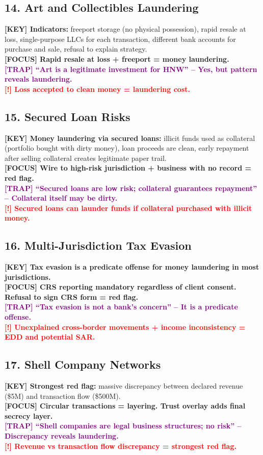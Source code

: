\documentclass[10pt,a4paper]{article}
\newcommand{\redflag}[1]{\textcolor{red}{\textbf{[!] #1}}}
\newcommand{\examfocus}[1]{\textcolor{orange!80!black}{\textbf{[FOCUS] #1}}}
\newcommand{\trap}[1]{\textcolor{purple}{\textbf{[TRAP] #1}}}
\newcommand{\keyterm}[1]{\textcolor{red!80!black}{\textbf{[KEY] #1}}}
\begin{document}
\subsection*{14. Art and Collectibles Laundering}
\keyterm{Indicators:} freeport storage (no physical possession), rapid resale at loss, single-purpose LLCs for each transaction, different bank accounts for purchase and sale, refusal to explain strategy. \\
\examfocus{Rapid resale at loss + freeport = money laundering.} \\
\trap{“Art is a legitimate investment for HNW” – Yes, but pattern reveals laundering.} \\
\redflag{Loss accepted to clean money = laundering cost.}

\subsection*{15. Secured Loan Risks}
\keyterm{Money laundering via secured loans:} illicit funds used as collateral (portfolio bought with dirty money), loan proceeds are clean, early repayment after selling collateral creates legitimate paper trail. \\
\examfocus{Wire to high-risk jurisdiction + business with no record = red flag.} \\
\trap{“Secured loans are low risk; collateral guarantees repayment” – Collateral itself may be dirty.} \\
\redflag{Secured loans can launder funds if collateral purchased with illicit money.}

\subsection*{16. Multi-Jurisdiction Tax Evasion}
\keyterm{Tax evasion is a predicate offense for money laundering in most jurisdictions.} \\
\examfocus{CRS reporting mandatory regardless of client consent. Refusal to sign CRS form = red flag.} \\
\trap{“Tax evasion is not a bank’s concern” – It is a predicate offense.} \\
\redflag{Unexplained cross-border movements + income inconsistency = EDD and potential SAR.}

\subsection*{17. Shell Company Networks}
\keyterm{Strongest red flag:} massive discrepancy between declared revenue (\$5M) and transaction flow (\$500M). \\
\examfocus{Circular transactions = layering. Trust overlay adds final secrecy layer.} \\
\trap{“Shell companies are legal business structures; no risk” – Discrepancy reveals laundering.} \\
\redflag{Revenue vs transaction flow discrepancy = strongest red flag.}
\end{document}
